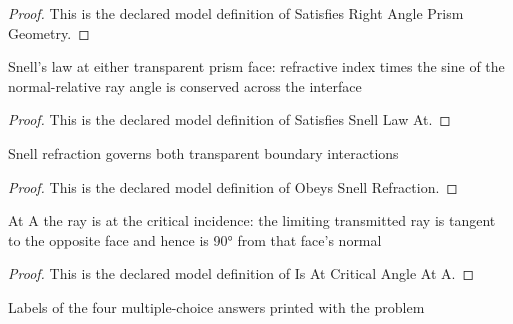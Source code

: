 \begin{proof}
  This is the declared model definition of Satisfies Right Angle Prism Geometry.
\end{proof}
\begin{definition}
  \label{def:physics:phyx-mini-0097:phyxminiproblems-problemphyxmini0097-satisfiessnelllawat}
  Snell's law at either transparent prism face: refractive index times the sine of the normal-relative ray angle is conserved across the interface
\end{definition}
\begin{proof}
  This is the declared model definition of Satisfies Snell Law At.
\end{proof}
\begin{definition}
  \label{def:physics:phyx-mini-0097:phyxminiproblems-problemphyxmini0097-obeyssnellrefraction}
  Snell refraction governs both transparent boundary interactions
\end{definition}
\begin{proof}
  This is the declared model definition of Obeys Snell Refraction.
\end{proof}
\begin{definition}
  \label{def:physics:phyx-mini-0097:phyxminiproblems-problemphyxmini0097-isatcriticalangleata}
  At A the ray is at the critical incidence: the limiting transmitted ray is tangent to the opposite face and hence is 90° from that face's normal
\end{definition}
\begin{proof}
  This is the declared model definition of Is At Critical Angle At A.
\end{proof}
\begin{definition}
  \label{def:physics:phyx-mini-0097:phyxminiproblems-problemphyxmini0097-answerchoice}
  Labels of the four multiple-choice answers printed with the problem
\end{definition}

